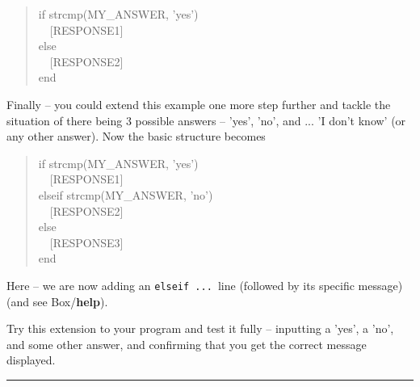 \documentclass{tufte-book} %
\newenvironment{docspec}{\begin{quotation}\ttfamily\parskip0pt\parindent0pt\ignorespaces}{\end{quotation}}
\begin{document}
\begin{docspec}
if strcmp(MY\_ANSWER, 'yes')
\\ \ \ [RESPONSE1]
\\else
\\ \ \ [RESPONSE2]
\\end
\end{docspec}

Finally -- you could extend this example one more step further and tackle the situation of there being 3 possible answers -- 'yes', 'no', and ... 'I don't know' (or any other answer).
Now the basic structure becomes
\begin{docspec}
if strcmp(MY\_ANSWER, 'yes')
\\ \ \ [RESPONSE1]
\\elseif strcmp(MY\_ANSWER, 'no')
\\ \ \ [RESPONSE2]
\\else
\\ \ \ [RESPONSE3]
\\end
\end{docspec}
\noindent Here -- we are now adding an \texttt{elseif ... }line (followed by its specific message) (and see Box/\textbf{help}). 

Try this extension to your program and test it fully -- inputting a 'yes', a 'no', and some other answer, and confirming that you get the correct message displayed.

\vspace{1mm}
\noindent\rule{4cm}{0.5pt}
\end{document}

